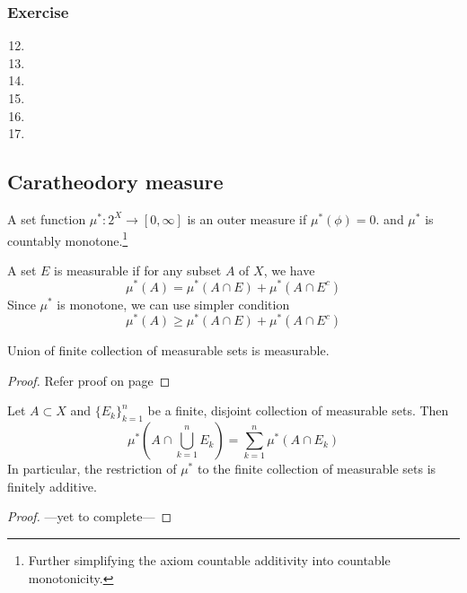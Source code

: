 \subsubsection{Exercise}
\begin{enumerate}
	\setcounter{enumi}{11}
	\item
	\item
	\item
	\item
	\item
	\item
\end{enumerate}

\subsection{Caratheodory measure}
\begin{definition}
	A set function $\mu^\ast : 2^X \to [0,\infty]$ is an outer measure if $\mu^\ast(\phi) = 0$. and $\mu^\ast$ is countably monotone.\dag\footnote{Further simplifying the axiom countable additivity into countable monotonicity.}
\end{definition}

\begin{definition}
	A set $E$ is measurable if for any subset $A$ of $X$, we have
	\[ \mu^\ast(A) = \mu^\ast(A \cap E) + \mu^\ast(A \cap E^c) \]
	Since $\mu^\ast$ is monotone, we can use simpler condition
	\[ \mu^\ast(A) \ge \mu^\ast(A \cap E) + \mu^\ast(A \cap E^c) \]
\end{definition}

\begin{theorem}
	Union of finite collection of measurable sets is measurable.
\end{theorem}
\begin{proof}
	Refer proof on page \pageref{thm:finiteunionmeasurable}
\end{proof}

\begin{theorem}
	Let $A \subset X$ and $\{ E_k \}_{k=1}^n$ be a finite, disjoint collection of measurable sets.
	Then
	\[ \mu^\ast \left( A \cap \bigcup_{k=1}^n E_k \right) = \sum_{k=1}^n \mu^\ast (A \cap E_k) \]
	In particular, the restriction of $\mu^\ast$ to the finite collection of measurable sets is finitely additive.
\end{theorem}
\begin{proof}
	---yet to complete---
\end{proof}

